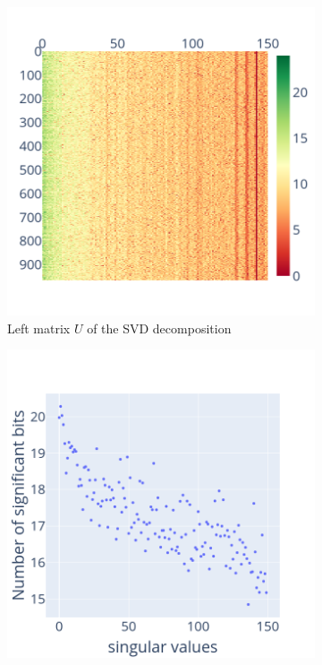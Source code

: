 \documentclass[11pt]{article}
\begin{document}
\begin{figure}
    \centering
    \begin{subfigure}{0.3\linewidth}
    \includegraphics[width=\linewidth]{figure/face_recognition/randomized_svd_ret_U_sig_zoom.png}
    \caption{Left matrix $U$ of the SVD decomposition}
    \label{fig:randomized_svd_U}
    \end{subfigure}
    \begin{subfigure}{0.3\linewidth}
    \includegraphics[width=\linewidth]{figure/face_recognition/randomized_svd_ret_S_sig.png}

\end{subfigure}
\end{figure}
\end{document}
